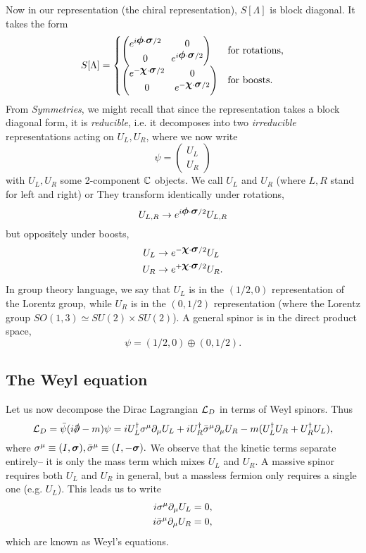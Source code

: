 Now in our representation (the chiral representation), $S[\Lambda]$ is block diagonal. It takes the form
$$
S[\Lambda]=\begin{cases}
    \begin{pmatrix}
        e^{i\mbox{\boldmath$ \phi $} \cdot \mbox{\boldmath$ \sigma $}/2} & 0\\
        0 & e^{i\mbox{\boldmath$ \phi $} \cdot \mbox{\boldmath$ \sigma $}/2}
    \end{pmatrix}
    & \text{for rotations,}\\
    \begin{pmatrix}
        e^{-\mbox{\boldmath$ \chi $} \cdot \mbox{\boldmath$ \sigma $}/2} & 0\\
        0 & e^{-\mbox{\boldmath$ \chi $} \cdot \mbox{\boldmath$ \sigma $}/2}
    \end{pmatrix}
    & \text{for boosts.}
\end{cases}
$$
From \emph{Symmetries}, we might recall that since the representation takes a block diagonal form, it is \emph{reducible}, i.e. it decomposes into two \emph{irreducible} representations acting on $U_L,U_R$, where we now write
$$\psi=\begin{pmatrix}U_L\\U_R\end{pmatrix}$$%
with $U_L,U_R$ some 2-component $\mathbb{C}$ objects. We call $U_L$ and $U_R$ (where $L,R$ stand for left and right)  or  They transform identically under rotations,
$$U_{L,R}\to e^{i\mbox{\boldmath$ \phi $} \cdot \mbox{\boldmath$ \sigma $}/2}U_{L,R}$$ but oppositely under boosts,
\begin{align*}
    U_L &\to e^{-\mbox{\boldmath$ \chi $} \cdot \mbox{\boldmath$ \sigma $}/2}U_L\\
    U_R &\to e^{+\mbox{\boldmath$ \chi $} \cdot \mbox{\boldmath$ \sigma $}/2}U_R.
\end{align*}
In group theory language, we say that $U_L$ is in the $(1/2,0)$ representation of the Lorentz group, while $U_R$ is in the $(0,1/2)$ representation (where the Lorentz group $SO(1,3)\simeq SU(2)\times SU(2)$). 
A general spinor is in the direct product space,
$$\psi=(1/2,0)\oplus(0,1/2).$$

\subsection*{The Weyl equation} Let us now decompose the Dirac Lagrangian $\mathcal L_D$ in terms of Weyl spinors. Thus
$$\cL_D=\bar\psi(i\slashed \p -m)\psi =i U_L^\dagger \sigma^\mu \p_\mu U_L + i U_R^\dagger \bar \sigma^\mu \p_\mu U_R - m(U_L^\dagger U_R+U_R^\dagger U_L),$$
where $\sigma^\mu\equiv (I,\mbox{\boldmath$ \sigma $}),\bar \sigma^\mu \equiv (I,-\mbox{\boldmath$ \sigma $}).$ We observe that the kinetic terms separate entirely-- it is only the mass term which mixes $U_L$ and $U_R$. A massive spinor requires both $U_L$ and $U_R$ in general, but a massless fermion only requires a single one (e.g. $U_L$). This leads us to write
\begin{align*}
    i\sigma^\mu \partial_\mu U_L&=0,\\
    i \bar \sigma^\mu \partial_\mu U_R&=0,
\end{align*}
which are known as Weyl's equations.

